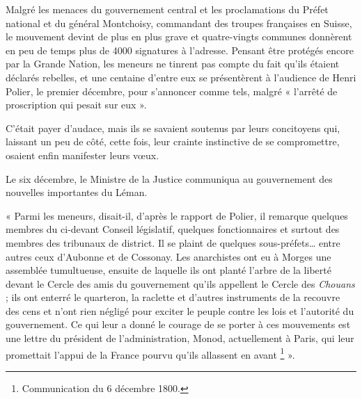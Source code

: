 \documentclass[french,twoside]{book} %
\newenvironment{quoteblock}%
  {\begin{quoting}}
  {\end{quoting}}
\newenvironment{quotebar}{%
    \def\FrameCommand{{\color{rubric!10!}\vrule width 0.5em} \hspace{0.9em}}%
    \def\OuterFrameSep{\itemsep} %
    \MakeFramed {\advance\hsize-\width \FrameRestore}
  }%
  {%
    \endMakeFramed
  }
\renewenvironment{quoteblock}%
  {%
    \savenotes
    \setstretch{0.9}
    \begin{quotebar}
  }
  {%
    \end{quotebar}
    \spewnotes
  }
\begin{document}
Malgré les menaces du gouvernement central et les proclamations du Préfet national et du général Montchoisy, commandant des troupes françaises en Suisse, le mouvement devint de plus en plus grave et quatre-vingts communes donnèrent en peu de temps plus de 4000 signatures à l’adresse. Pensant être protégés encore par la Grande Nation, les meneurs ne tinrent pas compte du fait qu’ils étaient déclarés rebelles, et une centaine d’entre eux se présentèrent à l’audience de Henri Polier, le premier décembre, pour s’annoncer comme tels, malgré « l’arrêté de proscription qui pesait sur eux ».\par
C’était payer d’audace, mais ils se savaient soutenus par leurs concitoyens qui, laissant un peu de côté, cette fois, leur crainte instinctive de se compromettre, osaient enfin manifester leurs vœux.\par
Le six décembre, le Ministre de la Justice communiqua au gouvernement des nouvelles importantes du Léman.\par

\begin{quoteblock}
 \noindent « Parmi les meneurs, disait-il, d’après le rapport de Polier, il remarque quelques membres du ci-devant Conseil législatif, quelques fonctionnaires et surtout des membres des tribunaux de district. Il se plaint de quelques sous-préfets… entre autres ceux d’Aubonne et de Cossonay. Les anarchistes ont eu à Morges une assemblée tumultueuse, ensuite de laquelle ils ont planté l’arbre de la liberté devant le Cercle des amis du gouvernement qu’ils appellent le Cercle des \emph{Chouans} ; ils ont enterré le quarteron, la raclette et d’autres instruments de la recouvre des cens et n’ont rien négligé pour exciter le peuple contre les lois et l’autorité du gouvernement. Ce qui leur a donné le courage de se porter à ces mouvements est une lettre du président de l’administration, Monod, actuellement à Paris, qui leur promettait l’appui de la France pourvu qu’ils allassent en avant \footnote{Communication du 6 décembre 1800.} ».
 \end{quoteblock}
\end{document}
